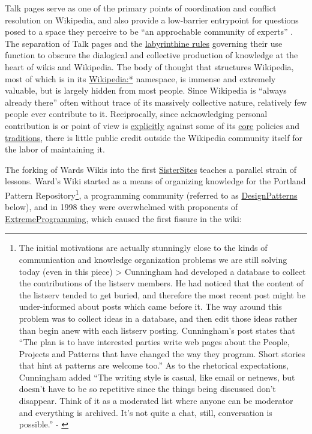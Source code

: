 \documentclass[10pt]{article}
\begin{document}
\begin{multicols}{2}
Talk pages serve as one of the primary points of coordination and
conflict resolution on Wikipedia, and also provide a low-barrier
entrypoint for questions posed to a space they perceive to be ``an
approchable community of experts'' \cite{viegasTalkYouType2007} .
The separation of Talk pages and the
\href{https://en.wikipedia.org/wiki/Wikipedia:Talk_page_guidelines}{labyrinthine
rules} governing their use function to obscure the dialogical and
collective production of knowledge at the heart of wikis and Wikipedia.
The body of thought that structures Wikipedia, most of which is in its
\href{https://en.wikipedia.org/wiki/Wikipedia:Community_portal}{Wikipedia:*}
namespace, is immense and extremely valuable, but is largely hidden from
most people. Since Wikipedia is ``always already there'' often without
trace of its massively collective nature, relatively few people ever
contribute to it. Reciprocally, since acknowledging personal
contribution is or point of view is
\href{https://en.wikipedia.org/wiki/Wikipedia:No_original_research}{explicitly}
against some of its
\href{https://en.wikipedia.org/wiki/Wikipedia:Neutral_point_of_view}{core}
policies and
\href{https://en.wikipedia.org/wiki/Wikipedia:Avoid_thread_mode}{traditions},
there is little public credit outside the Wikipedia community itself for
the labor of maintaining it.

The forking of Wards Wikis into the first
\href{http://wiki.c2.com/?SisterSites}{SisterSites} teaches a parallel
strain of lessons. Ward's Wiki started as a means of organizing
knowledge for the Portland Pattern Repository\footnote{The initial
  motivations are actually stunningly close to the kinds of
  communication and knowledge organization problems we are still solving
  today (even in this piece) \textgreater{} Cunningham had developed a
  database to collect the contributions of the listserv members. He had
  noticed that the content of the listserv tended to get buried, and
  therefore the most recent post might be under-informed about posts
  which came before it. The way around this problem was to collect ideas
  in a database, and then edit those ideas rather than begin anew with
  each listserv posting. Cunningham's post states that ``The plan is to
  have interested parties write web pages about the People, Projects and
  Patterns that have changed the way they program. Short stories that
  hint at patterns are welcome too.'' As to the rhetorical expectations,
  Cunningham added ``The writing style is casual, like email or netnews,
  but doesn't have to be so repetitive since the things being discussed
  don't disappear. Think of it as a moderated list where anyone can be
  moderator and everything is archived. It's not quite a chat, still,
  conversation is possible.'' - \cite{cummingsWhatWasWikiWhy2009} }, a programming community (referred to as
\href{http://wiki.c2.com/?DesignPatterns}{DesignPatterns} below), and in
1998 they were overwhelmed with proponents of
\href{http://wiki.c2.com/?ExtremeProgramming}{ExtremeProgramming}, which
caused the first fissure in the wiki:


\end{multicols}
\end{document}
